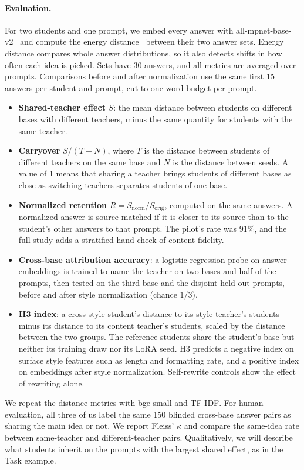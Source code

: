 \documentclass{article}
\begin{document}
\paragraph{Evaluation.}
For two students and one prompt, we embed every answer with all-mpnet-base-v2~\cite{reimers2019sbert} and compute the energy distance~\cite{szekely2013energy} between their two answer sets. Energy distance compares whole answer distributions, so it also detects shifts in how often each idea is picked. Sets have 30 answers, and all metrics are averaged over prompts. Comparisons before and after normalization use the same first 15 answers per student and prompt, cut to one word budget per prompt.
\begin{itemize}
    \item \textbf{Shared-teacher effect} $S$: the mean distance between students on different bases with different teachers, minus the same quantity for students with the same teacher.
    \item \textbf{Carryover} $S/(T-N)$, where $T$ is the distance between students of different teachers on the same base and $N$ is the distance between seeds. A value of 1 means that sharing a teacher brings students of different bases as close as switching teachers separates students of one base.
    \item \textbf{Normalized retention} $R=S_{\mathrm{norm}}/S_{\mathrm{orig}}$, computed on the same answers. A normalized answer is source-matched if it is closer to its source than to the student's other answers to that prompt. The pilot's rate was 91\%, and the full study adds a stratified hand check of content fidelity.
    \item \textbf{Cross-base attribution accuracy}: a logistic-regression probe on answer embeddings is trained to name the teacher on two bases and half of the prompts, then tested on the third base and the disjoint held-out prompts, before and after style normalization (chance $1/3$).
    \item \textbf{H3 index}: a cross-style student's distance to its style teacher's students minus its distance to its content teacher's students, scaled by the distance between the two groups. The reference students share the student's base but neither its training draw nor its LoRA seed. H3 predicts a negative index on surface style features such as length and formatting rate, and a positive index on embeddings after style normalization. Self-rewrite controls show the effect of rewriting alone.
\end{itemize}
We repeat the distance metrics with bge-small and TF-IDF. For human evaluation, all three of us label the same 150 blinded cross-base answer pairs as sharing the main idea or not. We report Fleiss' $\kappa$ and compare the same-idea rate between same-teacher and different-teacher pairs. Qualitatively, we will describe what students inherit on the prompts with the largest shared effect, as in the Task example.
\end{document}
